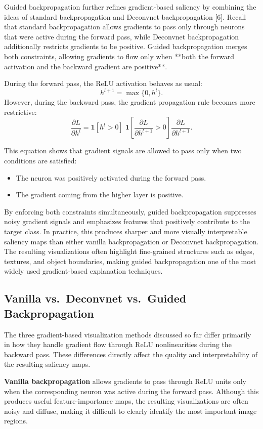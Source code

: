 \documentclass{article}
\renewcommand{\cite}[1]{[#1]}
\begin{document}
Guided backpropagation further refines gradient-based saliency by combining the ideas of standard backpropagation and Deconvnet backpropagation \cite{6}. Recall that standard backpropagation allows gradients to pass only through neurons that were active during the forward pass, while Deconvnet backpropagation additionally restricts gradients to be positive. Guided backpropagation merges both constraints, allowing gradients to flow only when **both the forward activation and the backward gradient are positive**.

During the forward pass, the ReLU activation behaves as usual:
\[
h^{l+1} = \max\{0, h^l\}.
\]
However, during the backward pass, the gradient propagation rule becomes more restrictive:
\[
\frac{\partial L}{\partial h^l}
= \mathbf{1}[h^l > 0]\;
  \mathbf{1}\!\left[\frac{\partial L}{\partial h^{l+1}} > 0\right]
  \frac{\partial L}{\partial h^{l+1}}.
\]

This equation shows that gradient signals are allowed to pass only when two conditions are satisfied:
\begin{itemize}
\item The neuron was positively activated during the forward pass.
\item The gradient coming from the higher layer is positive.
\end{itemize}

By enforcing both constraints simultaneously, guided backpropagation suppresses noisy gradient signals and emphasizes features that positively contribute to the target class. In practice, this produces sharper and more visually interpretable saliency maps than either vanilla backpropagation or Deconvnet backpropagation. The resulting visualizations often highlight fine-grained structures such as edges, textures, and object boundaries, making guided backpropagation one of the most widely used gradient-based explanation techniques.


\subsection{Vanilla vs.\ Deconvnet vs.\ Guided Backpropagation}

The three gradient-based visualization methods discussed so far differ primarily in how they handle gradient flow through ReLU nonlinearities during the backward pass. These differences directly affect the quality and interpretability of the resulting saliency maps.

\textbf{Vanilla backpropagation} allows gradients to pass through ReLU units only when the corresponding neuron was active during the forward pass. Although this produces useful feature-importance maps, the resulting visualizations are often noisy and diffuse, making it difficult to clearly identify the most important image regions.
\end{document}
